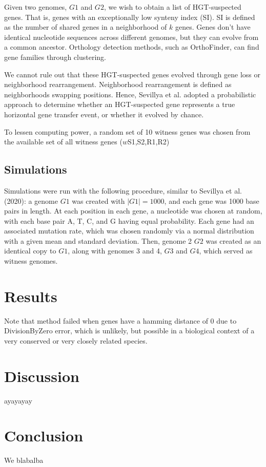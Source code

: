 \documentclass{article}
\begin{document}
Given two genomes, $G1$ and $G2$, we wish to obtain a list of HGT-suspected genes. That is, genes with an exceptionally low synteny index (SI). SI is defined as the number of shared genes in a neighborhood of $k$ genes. Genes don't have identical nucleotide sequences across different genomes, but they can evolve from a common ancestor. Orthology detection methods, such as OrthoFinder, can find gene families through clustering. 

We cannot rule out that these HGT-suspected genes evolved through gene loss or neighborhood rearrangement. Neighborhood rearrangement is defined as neighborhoods swapping positions. Hence, Sevillya et al. adopted a probabilistic approach to determine whether an HGT-suspected gene represents a true horizontal gene transfer event, or whether it evolved by chance.

To lessen computing power, a random set of 10 witness genes was chosen from the available set of all witness genes ($w$\in S1,S2,R1,R2)

\subsection{Simulations}
Simulations were run with the following procedure, similar to Sevillya et al. (2020): a genome $G1$ was created with $|G1| = 1000$, and each gene was 1000 base pairs in length. At each position in each gene, a nucleotide was chosen at random, with each base pair A, T, C, and G having equal probability. Each gene had an associated mutation rate, which was chosen randomly via a normal distribution with a given mean and standard deviation. Then, genome 2 $G2$ was created as an identical copy to $G1$, along with genomes 3 and 4, $G3$ and $G4$, which served as witness genomes. 

\section{Results}
Note that method failed when genes have a hamming distance of 0 due to DivisionByZero error, which is unlikely, but possible in a biological context of a very conserved or very closely related species.

\section{Discussion}
ayayayay

\section{Conclusion}
We blabalba
\end{document}
